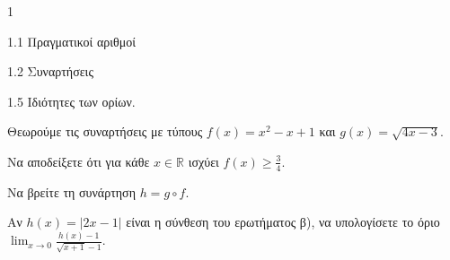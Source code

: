 \begin{ylh}{1}
    \item 1.1 Πραγματικοί αριθμοί
    \item 1.2 Συναρτήσεις
    \item 1.5 Ιδιότητες των ορίων.
\end{ylh}
Θεωρούμε τις συναρτήσεις με τύπους $f(x)=x^2-x+1$ και $g(x)=\sqrt{4x-3}$.
\begin{alist}
\item Να αποδείξετε ότι για κάθε $x \in \mathbb{R}$ ισχύει $f(x) \ge \frac{3}{4}$. 
\item Να βρείτε τη συνάρτηση $h=g \circ f$. 
\item Αν $h(x)=|2x-1|$ είναι η σύνθεση του ερωτήματος β), να υπολογίσετε το όριο $\lim_{x \to 0} \frac{h(x)-1}{\sqrt{x+1}-1}$. 
\end{alist}